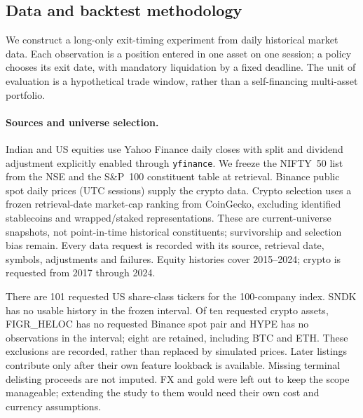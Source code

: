 \subsection{Data and backtest methodology}
\label{sec:data}
We construct a long-only exit-timing experiment from daily historical market data.
Each observation is a position entered in one asset on one session; a policy chooses
its exit date, with mandatory liquidation by a fixed deadline. The unit of evaluation
is a hypothetical trade window, rather than a self-financing multi-asset portfolio.

\paragraph{Sources and universe selection.}
Indian and US equities use Yahoo Finance daily closes with split and dividend
adjustment explicitly enabled through \texttt{yfinance}. We freeze the NIFTY~50 list
from the NSE and the S\&P~100 constituent table at retrieval. Binance public spot daily
prices (UTC sessions) supply the crypto data. Crypto selection uses
a frozen retrieval-date market-cap ranking from CoinGecko, excluding identified
stablecoins and wrapped/staked representations. These are current-universe snapshots,
not point-in-time historical constituents; survivorship and selection bias remain.
Every data request is recorded with its source, retrieval date, symbols, adjustments and
failures. Equity histories cover 2015--2024; crypto is requested from 2017 through 2024.

\begin{center}

\end{center}

There are 101 requested US share-class tickers for the 100-company index. SNDK has no
usable history in the frozen interval. Of ten requested crypto assets, FIGR\_HELOC
has no requested Binance spot pair and HYPE has no observations in the interval;
eight are retained, including BTC and ETH. These exclusions are recorded, rather
than replaced by simulated prices. Later listings contribute only after their own
feature lookback is available. Missing terminal delisting proceeds are not imputed.
FX and gold were left out to keep the scope manageable; extending the study to them would
need their own cost and currency assumptions.

